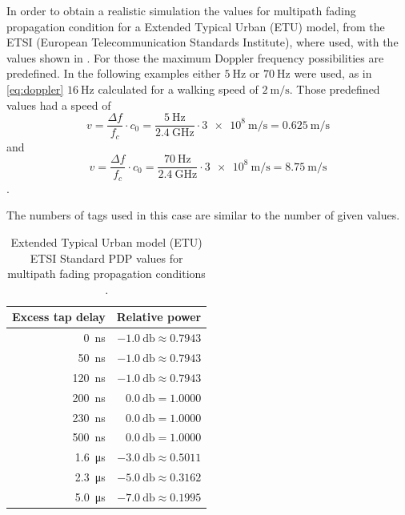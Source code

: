 In order to obtain a realistic simulation the values for multipath fading propagation condition for a Extended Typical Urban (ETU) model, from the ETSI (European Telecommunication Standards Institute), where used\cite{ETSI}, with the values shown in . For those the maximum Doppler frequency possibilities are predefined. In the following examples  either \(\SI{5}{\hertz}\) or \(\SI{70}{\hertz}\) were used, as in \eqref{eq:doppler} \(\SI{16}{\hertz}\) calculated for a walking speed of \(\SI{2}{\meter\per\second}\). Those predefined values had a speed of
\begin{equation}
	v = \frac{\Delta f}{f_c}\cdot c_0 = \frac{\SI{5}{\hertz}}{\SI{2.4}{\giga\hertz}}\cdot \SI{3e8}{\meter\per\second}= \SI{0.625}{\meter\per\second}
\end{equation}
and
\begin{equation}
	v = \frac{\Delta f}{f_c}\cdot c_0 = \frac{\SI{70}{\hertz}}{\SI{2.4}{\giga\hertz}}\cdot \SI{3e8}{\meter\per\second}= \SI{8.75}{\meter\per\second}
\end{equation}.

The numbers of tags used in this case are similar to the number of given values.

\begin{table}[b]
	\centering
	\begin{tabular}{rr}
		\toprule
		\bfseries Excess tap delay & \bfseries Relative power \\
		\midrule
		\SI{   0}{\nano\second} & \(\SI{-1.0}{\decibel} \approx 0.7943\) \\
		\SI{  50}{\nano\second} & \(\SI{-1.0}{\decibel} \approx 0.7943\) \\
		\SI{ 120}{\nano\second} & \(\SI{-1.0}{\decibel} \approx 0.7943\) \\
		\SI{ 200}{\nano\second} & \(\SI{ 0.0}{\decibel} = 1.0000\) \\
		\SI{ 230}{\nano\second} & \(\SI{ 0.0}{\decibel} = 1.0000\) \\
		\SI{ 500}{\nano\second} & \(\SI{ 0.0}{\decibel} = 1.0000\) \\
		\SI{1.6}{\micro\second} & \(\SI{-3.0}{\decibel} \approx 0.5011\) \\
		\SI{2.3}{\micro\second} & \(\SI{-5.0}{\decibel} \approx 0.3162\) \\
		\SI{5.0}{\micro\second} & \(\SI{-7.0}{\decibel} \approx 0.1995\) \\
		\bottomrule
	\end{tabular}
	\caption{Extended Typical Urban model (ETU) ETSI Standard PDP values for multipath fading propagation conditions \cite{ETSI}. \label{tab:etsi-tap-values}}
\end{table}


